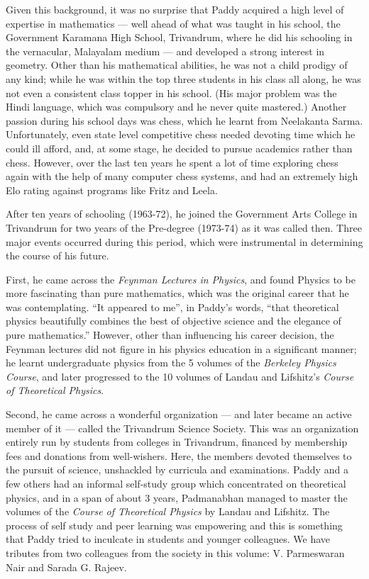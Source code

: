 \documentclass[prd, preprint, longbibliography, 12pt]{revtex4-2}
\begin{document}
Given this background, it was no surprise that Paddy acquired a high
level of expertise in mathematics --- well ahead of what was taught in
his school, the Government Karamana High School, Trivandrum, where he
did his schooling in the vernacular, Malayalam medium --- and
developed a strong interest in geometry.
Other than his mathematical abilities, he was not a child prodigy of
any kind; while he was within the top three students in his class all
along, he was not even a consistent class topper in his school.
(His major problem was the Hindi language, which was compulsory and he
never quite mastered.)
Another passion during his school days was chess, which  he learnt
from Neelakanta Sarma.
Unfortunately, even state level competitive chess needed devoting time
which he could ill afford, and, at some stage, he decided to pursue
academics rather than chess.
However, over the last ten years he spent a
lot of time exploring chess again with the help of many computer chess
systems, and had an extremely high Elo rating against programs like
Fritz and Leela. 

After ten years of schooling (1963-72), he joined the Government Arts
College in Trivandrum for two years of the Pre-degree (1973-74) as it
was called then.
Three major events occurred during this period, which were
instrumental in determining the course of his future.  

First, he came across the \textit{Feynman Lectures in Physics}, and
found Physics to be more fascinating than pure mathematics, which was
the original career that he was contemplating.
``It appeared to me'', in Paddy's words, ``that theoretical physics
beautifully combines the best of objective science and the elegance of
pure mathematics.''
However, other than influencing his career decision, the Feynman
lectures did not figure in his physics education in a significant
manner; he learnt undergraduate physics from the 5 volumes of the
\textit{Berkeley Physics Course}, and later progressed to the 10
volumes of Landau and Lifshitz's \textit{Course of Theoretical
  Physics}.   

Second, he came across a wonderful organization --- and later became
an active member of it --- called the Trivandrum Science Society.
This was an organization entirely run by students from colleges in
Trivandrum, financed by membership fees and donations from
well-wishers.
Here, the members devoted themselves to the pursuit of science,
unshackled by curricula and examinations.
Paddy and a few others had an informal self-study group which
concentrated on theoretical physics, and in a span of about 3 years,
Padmanabhan managed to master the volumes of the \textit{Course of
  Theoretical Physics} by Landau and Lifshitz.
The process of self study and peer learning was empowering and this is
something that Paddy tried to inculcate in students and younger
colleagues. 
We have tributes from two colleagues from the society in this volume:
V. Parmeswaran Nair and Sarada G. Rajeev.
\end{document}
